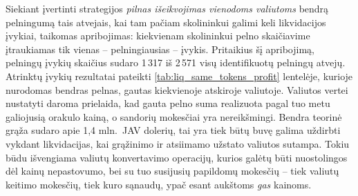 \documentclass[]{VUMIFTemplateClass}
\begin{document}


Siekiant įvertinti strategijos \textit{pilnas išeikvojimas vienodoms valiutoms} bendrą pelningumą tais atvejais, kai tam pačiam skolininkui galimi keli likvidacijos įvykiai, taikomas apribojimas: kiekvienam skolininkui pelno skaičiavime įtraukiamas tik vienas – pelningiausias – įvykis. Pritaikius šį apribojimą, pelningų įvykių skaičius sudaro 1\,317 iš 2\,571 visų identifikuotų pelningų atvejų. Atrinktų įvykių rezultatai pateikti \ref{tab:liq_same_tokens_profit} lentelėje, kurioje nurodomas bendras pelnas, gautas kiekvienoje atskiroje valiutoje. Valiutos vertei nustatyti daroma prielaida, kad gauta pelno suma realizuota pagal tuo metu galiojusią orakulo kainą, o sandorių mokesčiai yra nereikšmingi. Bendra teorinė grąža sudaro apie 1,4 mln.\ JAV dolerių, tai yra tiek būtų buvę galima uždirbti vykdant likvidacijas, kai grąžinimo ir atsiimamo užstato valiutos sutampa. Tokiu būdu išvengiama valiutų konvertavimo operacijų, kurios galėtų būti nuostolingos dėl kainų nepastovumo, bei su tuo susijusių papildomų mokesčių – tiek valiutų keitimo mokesčių, tiek kuro sąnaudų, ypač esant aukštoms \textit{gas} kainoms.
\end{document}
